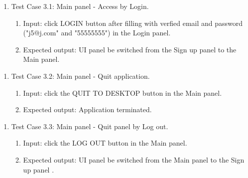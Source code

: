 \documentclass[11pt]{article}
\begin{document}
    \begin{enumerate}
        \item Test Case 3.1: Main panel - Access by Login.
        \begin{enumerate}
            \item  Input: click LOGIN button after filling with verfied email and password ("j5@j.com" and "55555555") in the Login panel.
            \item  Expected output: UI panel be switched from the Sign up panel to the Main panel.
        \end{enumerate}
    \end{enumerate}
    \begin{enumerate}
        \item Test Case 3.2: Main panel - Quit application.
        \begin{enumerate}
            \item  Input: click the QUIT TO DESKTOP button in the Main panel.
            \item  Expected output: Application terminated.
        \end{enumerate}
    \end{enumerate}
    \begin{enumerate}
        \item Test Case 3.3: Main panel - Quit panel by Log out.
        \begin{enumerate}
            \item  Input: click the LOG OUT button in the Main panel.
            \item  Expected output: UI panel be switched from the Main panel to the Sign up panel .
        \end{enumerate}
    \end{enumerate}
\end{document}
